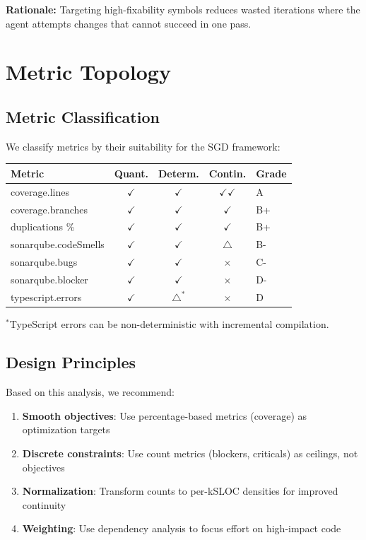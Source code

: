 \documentclass[11pt,a4paper]{article}
\begin{document}
\textbf{Rationale:} Targeting high-fixability symbols reduces wasted iterations where the agent attempts changes that cannot succeed in one pass.

\section{Metric Topology}
\label{sec:topology}

\subsection{Metric Classification}

We classify metrics by their suitability for the SGD framework:

\begin{center}
\begin{tabular}{lcccl}
\toprule
\textbf{Metric} & \textbf{Quant.} & \textbf{Determ.} & \textbf{Contin.} & \textbf{Grade} \\
\midrule
coverage.lines & $\checkmark$ & $\checkmark$ & $\checkmark\checkmark$ & A \\
coverage.branches & $\checkmark$ & $\checkmark$ & $\checkmark$ & B+ \\
duplications \% & $\checkmark$ & $\checkmark$ & $\checkmark$ & B+ \\
sonarqube.codeSmells & $\checkmark$ & $\checkmark$ & $\triangle$ & B- \\
sonarqube.bugs & $\checkmark$ & $\checkmark$ & $\times$ & C- \\
sonarqube.blocker & $\checkmark$ & $\checkmark$ & $\times$ & D- \\
typescript.errors & $\checkmark$ & $\triangle^*$ & $\times$ & D \\
\bottomrule
\end{tabular}
\end{center}

$^*$TypeScript errors can be non-deterministic with incremental compilation.

\subsection{Design Principles}

Based on this analysis, we recommend:

\begin{enumerate}
  \item \textbf{Smooth objectives}: Use percentage-based metrics (coverage) as optimization targets
  \item \textbf{Discrete constraints}: Use count metrics (blockers, criticals) as ceilings, not objectives
  \item \textbf{Normalization}: Transform counts to per-kSLOC densities for improved continuity
  \item \textbf{Weighting}: Use dependency analysis to focus effort on high-impact code
\end{enumerate}
\end{document}
